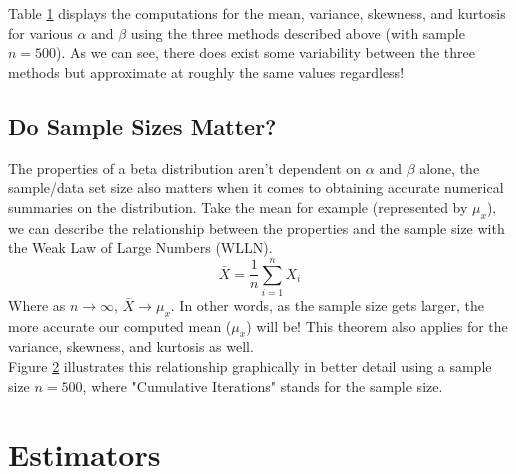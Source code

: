 \documentclass{article}\usepackage[]{graphicx}\usepackage[]{xcolor}
\begin{document}
\begin{multicols}{2}
Table \hyperref[tab1]{1} displays the computations for the mean, variance, skewness, and kurtosis for various $\alpha$ and $\beta$ using the three methods described above (with sample $n=500$). As we can see, there does exist some variability between the three methods but approximate at roughly the same values regardless!

\subsection{Do Sample Sizes Matter?}
The properties of a beta distribution aren't dependent on $\alpha$ and $\beta$ alone, the sample/data set size also matters when it comes to obtaining accurate numerical summaries on the distribution. Take the mean for example (represented by $\mu_x$), we can describe the relationship between the properties and the sample size with the Weak Law of Large Numbers (WLLN).
\[
\bar{X} = \frac{1}{n} \sum_{i=1}^{n} X_i
\]
Where as $n \to \infty$, $\bar{X} \to \mu_x$. In other words, as the sample size gets larger, the more accurate our computed mean ($\mu_x$) will be! This theorem also applies for the variance, skewness, and kurtosis as well. \\

Figure \hyperref[fig2]{2} illustrates this relationship graphically in better detail using a sample size $n = 500$, where "Cumulative Iterations" stands for the sample size.

\section{Estimators}

\end{multicols}
\end{document}
